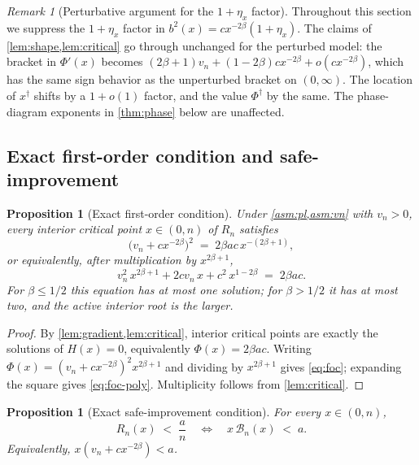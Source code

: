 \documentclass[11pt]{article}
\theoremstyle{plain}
\newtheorem{proposition}[theorem]{Proposition}
\theoremstyle{definition}
\theoremstyle{remark}
\newtheorem{remark}[theorem]{Remark}
\begin{document}
\begin{remark}[Perturbative argument for the $1+\eta_x$ factor]\label{rem:perturb}
Throughout this section we suppress the $1+\eta_x$ factor in $b^2(x)=cx^{-2\beta}(1+\eta_x)$. The claims of \cref{lem:shape,lem:critical} go through unchanged for the perturbed model: the bracket in $\Phi'(x)$ becomes $(2\beta+1)v_n+(1-2\beta)cx^{-2\beta}+o(cx^{-2\beta})$, which has the same sign behavior as the unperturbed bracket on $(0,\infty)$. The location of $x^\dagger$ shifts by a $1+o(1)$ factor, and the value $\Phi^\dagger$ by the same. The phase-diagram exponents in \cref{thm:phase} below are unaffected.
\end{remark}

\subsection{Exact first-order condition and safe-improvement}
\label{ssec:foc}

\begin{proposition}[Exact first-order condition]\label{prop:foc}
Under \cref{asm:pl,asm:vn} with $v_n>0$, every interior critical point $x\in(0,n)$ of $R_n$ satisfies
\begin{equation}\label{eq:foc}
\boxed{\bigl(v_n+cx^{-2\beta}\bigr)^2\;=\;2\beta a c\,x^{-(2\beta+1)},}
\end{equation}
or equivalently, after multiplication by $x^{2\beta+1}$,
\begin{equation}\label{eq:foc-poly}
v_n^2\,x^{2\beta+1}+2cv_n\,x+c^2\,x^{1-2\beta}\;=\;2\beta a c.
\end{equation}
For $\beta\le1/2$ this equation has at most one solution; for $\beta>1/2$ it has at most two, and the active interior root is the larger.
\end{proposition}

\begin{proof}
By \cref{lem:gradient,lem:critical}, interior critical points are exactly the solutions of $H(x)=0$, equivalently $\Phi(x)=2\beta ac$. Writing $\Phi(x)=(v_n+cx^{-2\beta})^2 x^{2\beta+1}$ and dividing by $x^{2\beta+1}$ gives \cref{eq:foc}; expanding the square gives \cref{eq:foc-poly}. Multiplicity follows from \cref{lem:critical}.
\end{proof}

\begin{proposition}[Exact safe-improvement condition]\label{prop:safe}
For every $x\in(0,n)$,
\begin{equation}\label{eq:safe}
R_n(x)\;<\;\frac{a}{n}\quad\Longleftrightarrow\quad \boxed{x\,\mathcal{B}_n(x)\;<\;a.}
\end{equation}
Equivalently, $x(v_n+cx^{-2\beta})<a$.
\end{proposition}
\end{document}
